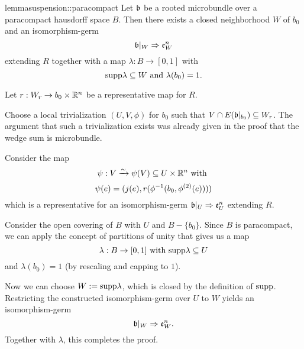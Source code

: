 \begin{mystatement}{lemma}{suspension::paracompact}
    Let $\bb$ be a rooted microbundle over a paracompact hausdorff space $B$.
    Then there exists a closed neighborhood $W$ of $b_0$ and an isomorphism-germ
    \[ \germ{\bb[W]}{\be{W}} \]
    extending $R$ together with a map $\lambda: B \to [0, 1]$ with
    \[ \text{supp}{\lambda} \subseteq{} W \text{ and } \lambda(b_0) = 1. \]
\end{mystatement}

\begin{myproof}
    Let $r: W_r \to b_0 \times \mathbb{R}^n$ be a representative map for $R$.
    
    Choose a local trivialization $(U, V, \phi)$ for $b_0$ such that $V \cap E(\bbb) \sub W_r$.
    The argument that such a trivialization exists was already given
    in the proof that the wedge sum is microbundle.

    Consider the map
    \[ \psi: V \xrightarrow{\sim} \psi(V) \subseteq{} U \times \mathbb{R}^n \text{ with } \]
    \[ \psi(e) = (j(e), r(\phi^{-1}(b_0, \phi^{(2)}(e)))) \]
    which is a representative for an isomorphism-germ $\germ{\bb[U]}{\be{U}}$ extending $R$.
    
    Consider the open covering of $B$ with $U$ and $B - \{b_0\}$.
    Since $B$ is paracompact, we can apply the concept
    of partitions of unity that gives us a map
    \[ \lambda: B \to [0, 1] \text{ with } \text{supp}{\lambda} \subseteq{} U \]
    and $\lambda(b_0) = 1$ (by rescaling and capping to $1$).

    Now we can choose $W := \text{supp}{\lambda}$, which is closed by the definition of $\text{supp}$.
    Restricting the constructed isomorphism-germ over $U$ to $W$
    yields an isomorphism-germ
    \[ \germ{\bb[W]}{\be{W}}. \]
    Together with $\lambda$, this completes the proof.
\end{myproof}
